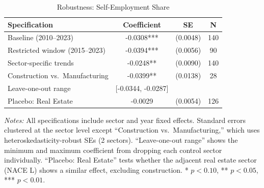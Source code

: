 \begin{table}[htbp]
\centering
\caption{Robustness: Self-Employment Share}
\label{tab:robustness}
\begin{threeparttable}
\begin{tabular}{lccc}
\toprule
Specification & Coefficient & SE & N \\
\midrule
Baseline (2010--2023) & -0.0308*** & (0.0048) & 140 \\
Restricted window (2015--2023) & -0.0394*** & (0.0056) & 90 \\
Sector-specific trends & -0.0248** & (0.0090) & 140 \\
Construction vs.\ Manufacturing & -0.0399** & (0.0138) & 28 \\
Leave-one-out range & [-0.0344, -0.0287] & & \\
Placebo: Real Estate & -0.0029 & (0.0054) & 126 \\
\bottomrule
\end{tabular}
\begin{tablenotes}[flushleft]
\small
\item \textit{Notes:} All specifications include sector and year fixed effects. Standard errors clustered at the sector level except ``Construction vs.\ Manufacturing,'' which uses heteroskedasticity-robust SEs (2 sectors). ``Leave-one-out range'' shows the minimum and maximum coefficient from dropping each control sector individually. ``Placebo: Real Estate'' tests whether the adjacent real estate sector (NACE L) shows a similar effect, excluding construction. * $p < 0.10$, ** $p < 0.05$, *** $p < 0.01$.
\end{tablenotes}
\end{threeparttable}
\end{table}
